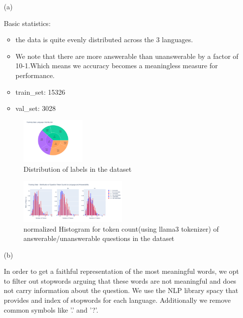 \documentclass[11pt]{article}
\begin{document}
\begin{enumerate}
    \item[(a)] 

    Basic statistics:
    \begin{itemize}
        \item the data is quite evenly distributed across the 3 languages.
        \item We note that there are more answerable than unanswerable by a factor of 10-1.Which means we accuracy becomes a meaningless measure for performance.
        \item train\_set: 15326
        \item val\_set: 3028
    \end{itemize}

    \begin{figure}[ht]
        \centering
        \includegraphics[width=0.3\textwidth]{week1_a_dataset.png}
        \caption{Distribution of labels in the dataset}
        \label{fig:label_distribution}
    \end{figure}

    \begin{figure}[ht]
        \centering
        \includegraphics[width=0.5\textwidth]{week1_a_lang_token_distribution_normalized.png}
        \caption{normalized Histogram for token count(using llama3 tokenizer) of answerable/unanswerable questions in the dataset}
        \label{fig:language_distribution}
    \end{figure}

    \item[(b)] 

    In order to get a faithful representation of the most meaningful words, we opt to filter out stopwords arguing that these words are not meaningful and does not carry information about the question.
    We use the NLP library spacy that provides and index of stopwords for each language. Additionally we remove common symbols like '.' and '?'.


\end{enumerate}
\end{document}
